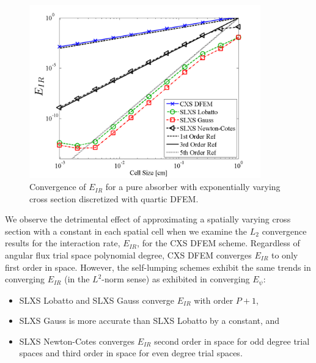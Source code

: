 %
%
\begin{figure}[!htp]
\centering
\includegraphics[width=10cm]{chapter3_variable_xs/P4_VarXS_E_I_L2.png}
\caption{Convergence of $E_{IR}$  for a pure absorber with exponentially varying cross section discretized with quartic DFEM.}
\label{fig:varxs_I_L2_p4}
\end{figure}
We observe the detrimental effect of approximating a spatially varying cross section with a constant in each spatial cell when we examine the $L_2$ convergence results for the interaction rate, $E_{IR}$, for the CXS DFEM scheme.
Regardless of angular flux trial space polynomial degree, CXS DFEM converges $E_{IR}$ to only first order in space.
However, the self-lumping schemes exhibit the same trends in converging $E_{IR}$ (in the $L^2$-norm sense) as exhibited in converging $E_{\psi}$:
\begin{itemize}
\item SLXS Lobatto and SLXS Gauss converge $E_{IR}$ with order $P+1$,
\item SLXS Gauss is more accurate than SLXS Lobatto by a constant, and
\item SLXS Newton-Cotes converges $E_{IR}$ second order in space for odd degree trial spaces and third order in space for even degree trial spaces.
\end{itemize}  


